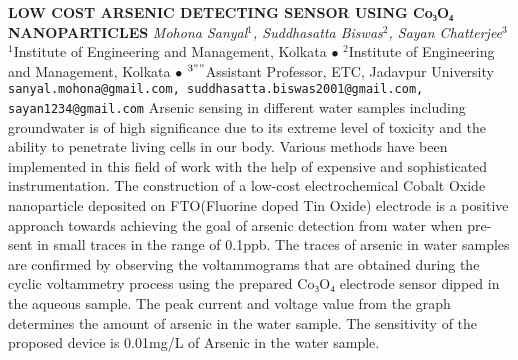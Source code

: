 
    \begin{conf-abstract}[]
        {\textbf{LOW COST ARSENIC DETECTING SENSOR USING Co₃O₄ NANOPARTICLES}}
        {\textit{Mohona Sanyal$^{1}$, Suddhasatta Biswas$^{2}$, Sayan Chatterjee$^{3}$}}
        {$^{1}$Institute of Engineering and Management, Kolkata $\bullet$ $^{2}$Institute of Engineering and Management, Kolkata $\bullet$ $^{3 ""}$Assistant Professor, ETC, Jadavpur University}
        {\texttt{sanyal.mohona@gmail.com, suddhasatta.biswas2001@gmail.com, sayan1234@gmail.com}}
        {Arsenic sensing in different water samples including groundwater is of high significance due to its extreme level of toxicity and the ability to penetrate living cells in our body. Various methods have been implemented in this field of work with the help of expensive and sophisticated instrumentation. The construction of a low-cost electrochemical Cobalt Oxide nanoparticle deposited on FTO(Fluorine doped Tin Oxide) electrode is a positive approach towards achieving the goal of arsenic detection from water when pre-sent in small traces in the range of 0.1ppb. The traces of arsenic in water samples are confirmed by observing the voltammograms that are obtained during the cyclic voltammetry process using the prepared Co₃O₄ electrode sensor dipped in the aqueous sample. The peak current and voltage value from the graph determines the amount of arsenic in the water sample. The sensitivity of the proposed device is 0.01mg/L of Arsenic in the water sample.}
    \end{conf-abstract}
        